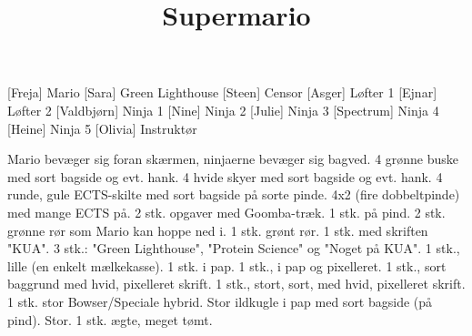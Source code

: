 \documentclass[a4paper,11pt]{article}
\title{Supermario}
\begin{document}
\maketitle

\begin{roles}
    [Freja]  Mario
    [Sara]  Green Lighthouse
    [Steen]  Censor
    [Asger]  Løfter 1
    [Ejnar]  Løfter 2
    [Valdbjørn]  Ninja 1
    [Nine]  Ninja 2
    [Julie]  Ninja 3
    [Spectrum]  Ninja 4
    [Heine]  Ninja 5
    [Olivia]  Instruktør
\end{roles}

\begin{props}
     Mario bevæger sig foran skærmen, ninjaerne bevæger sig bagved.
    4 grønne buske med sort bagside og evt. hank.
     4 hvide skyer med sort bagside og evt. hank.
     4 runde, gule ECTS-skilte med sort bagside på sorte pinde.
     4x2 (fire dobbeltpinde) med mange ECTS på.
     2 stk. opgaver med Goomba-træk.
     1 stk. på pind.
     2 stk. grønne rør som Mario kan hoppe ned i.
     1 stk. grønt rør.
     1 stk. med skriften "KUA".
     3 stk.: "Green Lighthouse", "Protein Science" og "Noget på KUA".
     1 stk., lille (en enkelt mælkekasse).
     1 stk. i pap.
     1 stk., i pap og pixelleret.
     1 stk., sort baggrund med hvid, pixelleret skrift.
     1 stk., stort, sort, med hvid, pixelleret skrift.
     1 stk. stor Bowser/Speciale hybrid.
     Stor ildkugle i pap med sort bagside (på pind).
     Stor.
     1 stk. ægte, meget tømt.
\end{props}
\end{document}
